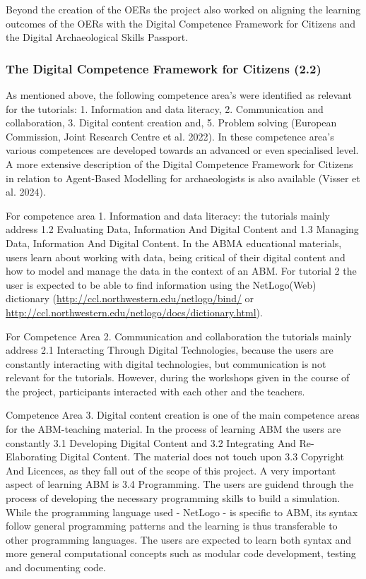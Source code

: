 \documentclass[
]{article}
\begin{document}
Beyond the creation of the OERs the project also worked on aligning the learning outcomes of the OERs with the Digital Competence Framework for Citizens and the Digital Archaeological Skills Passport.

\hypertarget{the-digital-competence-framework-for-citizens-2.2}{%
\subsubsection{The Digital Competence Framework for Citizens (2.2)}\label{the-digital-competence-framework-for-citizens-2.2}}

As mentioned above, the following competence area's were identified as relevant for the tutorials: 1. Information and data literacy, 2. Communication and collaboration, 3. Digital content creation and, 5. Problem solving (European Commission, Joint Research Centre et al. 2022). In these competence area's various competences are developed towards an advanced or even specialised level. A more extensive description of the Digital Competence Framework for Citizens in relation to Agent-Based Modelling for archaeologists is also available (Visser et al. 2024).

For competence area 1. Information and data literacy: the tutorials mainly address 1.2 Evaluating Data, Information And Digital Content and 1.3 Managing Data, Information And Digital Content. In the ABMA educational materials, users learn about working with data, being critical of their digital content and how to model and manage the data in the context of an ABM. For tutorial 2 the user is expected to be able to find information using the NetLogo(Web) dictionary (\url{http://ccl.northwestern.edu/netlogo/bind/} or \url{http://ccl.northwestern.edu/netlogo/docs/dictionary.html}).

For Competence Area 2. Communication and collaboration the tutorials mainly address 2.1 Interacting Through Digital Technologies, because the users are constantly interacting with digital technologies, but communication is not relevant for the tutorials. However, during the workshops given in the course of the project, participants interacted with each other and the teachers.

Competence Area 3. Digital content creation is one of the main competence areas for the ABM-teaching material. In the process of learning ABM the users are constantly 3.1 Developing Digital Content and 3.2 Integrating And Re-Elaborating Digital Content. The material does not touch upon 3.3 Copyright And Licences, as they fall out of the scope of this project. A very important aspect of learning ABM is 3.4 Programming. The users are guidend through the process of developing the necessary programming skills to build a simulation. While the programming language used - NetLogo - is specific to ABM, its syntax follow general programming patterns and the learning is thus transferable to other programming languages. The users are expected to learn both syntax and more general computational concepts such as modular code development, testing and documenting code.
\end{document}
